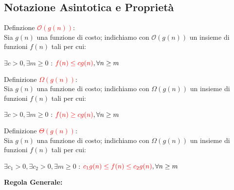 \documentclass[../cheatSheetAlgoritmi.tex]{subfiles}
\begin{document}
\subsection{Notazione Asintotica e Proprietà}
Definzione \textcolor{red}{$\mathcal{O}(g(n))$}:\\
Sia $g(n)$ una funzione di costo; indichiamo con $\mathcal{O}(g(n))$ un insieme di funzioni $f(n)$ tali per cui:
\begin{center}
$\exists c > 0, \exists m \geq 0$ : $\textcolor{red}{f(n) \leq cg(n)} , \forall n \geq m$
\end{center}
Definizione \textcolor{red}{$\Omega(g(n))$}:\\
Sia $g(n)$ una funzione di costo; indichiamo con $\Omega(g(n))$ un insieme di funzioni $f(n)$ tali per cui:
\begin{center}
$\exists c > 0, \exists m \geq 0$ : $\textcolor{red}{f(n) \geq cg(n)} , \forall n \geq m$
\end{center}
Definizione \textcolor{red}{$\Theta(g(n))$}:\\
Sia $g(n)$ una funzione di costo; indichiamo con $\Omega(g(n))$ un insieme di funzioni $f(n)$ tali per cui:
\begin{center}
$\exists c_1 > 0, \exists c_2 > 0, \exists m \geq 0$ : $\textcolor{red}{c_1g(n) \leq f(n) \leq c_2g(n)} , \forall n \geq m$
\end{center}
\newpage
\begin{flushleft}
\textbf{Regola Generale:}
\end{flushleft}
\end{document}
